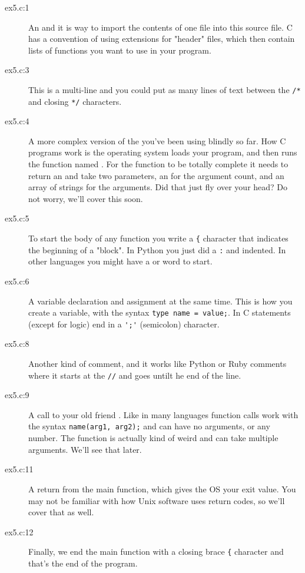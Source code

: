 \begin{description}
\item[ex5.c:1] An  and it is way to import the contents
    of one file into this source file.  C has a convention of using 
     extensions for "header" files, which then contain lists
    of functions you want to use in your program.
\item[ex5.c:3] This is a multi-line  and you could put as many
    lines of text between the \verb|/*| and closing \verb|*/| characters.
\item[ex5.c:4] A more complex version of the  you've
    been using blindly so far.  How C programs work is the operating system
    loads your program, and then runs the function named .
    For the function to be totally complete it needs to return an 
    and take two parameters, an  for the argument count, and
    an array of  strings for the arguments.  Did that
    just fly over your head?  Do not worry, we'll cover this soon.
\item[ex5.c:5] To start the body of any function you write a \verb|{| character
    that indicates the beginning of a "block".  In Python you just
    did a \verb|:| and indented. In other languages you might have a
     or  word to start.
\item[ex5.c:6] A variable declaration and assignment at the same time.
    This is how you create a variable, with the syntax \verb|type name = value;|.  In C statements (except for logic) end in a \verb|';'| (semicolon) character.
\item[ex5.c:8] Another kind of comment, and it works like Python or 
    Ruby comments where it starts at the \verb|//| and goes untilt he end of 
    the line.
\item[ex5.c:9] A call to your old friend .  Like in many languages
    function calls work with the syntax \verb|name(arg1, arg2);| and can have
    no arguments, or any number.  The  function is actually
    kind of weird and can take multiple arguments. We'll see that later.
\item[ex5.c:11] A return from the main function, which gives the OS your exit
    value.  You may not be familiar with how Unix software uses return
    codes, so we'll cover that as well.
\item[ex5.c:12] Finally, we end the main function with a closing brace \verb|{|
    character and that's the end of the program.
\end{description}

